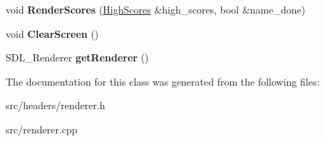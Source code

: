 \begin{DoxyCompactItemize}
\item 
void {\bfseries Render\+Scores} (\hyperlink{classHighScores}{High\+Scores} \&high\+\_\+scores, bool \&name\+\_\+done)\hypertarget{classRenderer_a6f4cfbd511f3cbe82779151d5ca45c54}{}\label{classRenderer_a6f4cfbd511f3cbe82779151d5ca45c54}

\item 
void {\bfseries Clear\+Screen} ()\hypertarget{classRenderer_a0a898e8884e656a3632ddd3b1798ea59}{}\label{classRenderer_a0a898e8884e656a3632ddd3b1798ea59}

\item 
S\+D\+L\+\_\+\+Renderer {\bfseries get\+Renderer} ()\hypertarget{classRenderer_a1ab670b0f308d05d5b09a130e093e907}{}\label{classRenderer_a1ab670b0f308d05d5b09a130e093e907}

\end{DoxyCompactItemize}


The documentation for this class was generated from the following files\+:\begin{DoxyCompactItemize}
\item 
src/headers/renderer.\+h\item 
src/renderer.\+cpp\end{DoxyCompactItemize}
